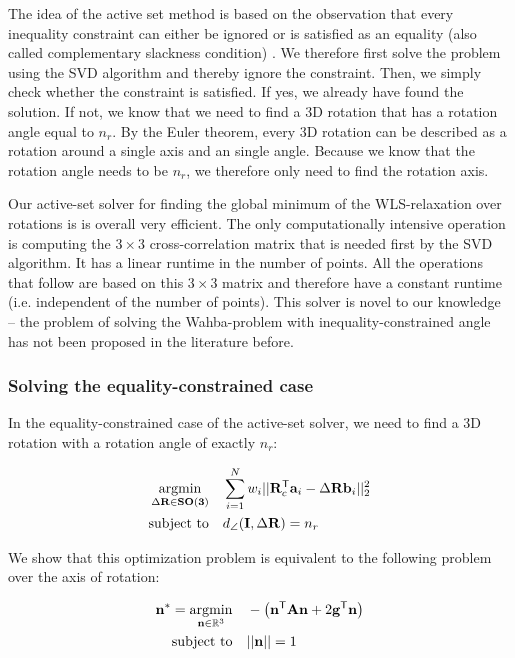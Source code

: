 The idea of the active set method is based on the observation that every inequality constraint can either be ignored or is satisfied as an equality (also called complementary slackness condition) \cite[Ch.15 p.424-427]{Numerical-Optimization-Nocedal-Wright}. We therefore first solve the problem using the SVD algorithm and thereby ignore the constraint. Then, we simply check whether the constraint is satisfied. If yes, we already have found the solution. If not, we know that we need to find a 3D rotation that has a rotation angle equal to $n_r$. By the Euler theorem, every 3D rotation can be described as a rotation around a single axis and an single angle. Because we know that the rotation angle needs to be $n_r$, we therefore only need to find the rotation axis.

Our active-set solver for finding the global minimum of the WLS-relaxation over rotations is is overall very efficient. The only computationally intensive operation is computing the $3 \times 3$ cross-correlation matrix that is needed first by the SVD algorithm. It has a linear runtime in the number of points. All the operations that follow are based on this $3 \times 3$ matrix and therefore have a constant runtime (i.e. independent of the number of points).
This solver is novel to our knowledge -- the problem of solving the Wahba-problem with inequality-constrained angle has not been proposed in the literature before.


\subsubsection{Solving the equality-constrained case}
In the equality-constrained case of the active-set solver, we need to find a 3D rotation with a rotation angle of exactly $n_r$:

\begin{equation}
	\label{eq:tls-rwls-eq}
	\begin{aligned}
		\operatorname*{argmin}_{\Delta \mathbf{R} \in \mathbf{SO(3)}}  \quad &\sum_{i=1}^{N} w_i ||\mathbf{R}_c^{\mathsf{T}} \mathbf{a}_i - \Delta\mathbf{R} \mathbf{b}_i ||_2^2 \\
		\text{subject to} \quad &d_{\angle}(\mathbf{I}, \Delta\mathbf{R}) = n_r
	\end{aligned}
\end{equation}

We show that this optimization problem is equivalent to the following problem over the axis of rotation:

\begin{equation}
	\begin{aligned}
		\label{eq:eq-constrained-prob-ev}
		\mathbf{n}^* = \operatorname*{argmin}_{\mathbf{n} \in \mathbb{R}^3} \quad &-\left(\mathbf{n}^{\mathsf{T}} \mathbf{A} \mathbf{n} + 2 \mathbf{g}^{\mathsf{T}} \mathbf{n} \right)\\
		\text{subject to} \quad &|| \mathbf{n}|| = 1\\
	\end{aligned}
\end{equation}

